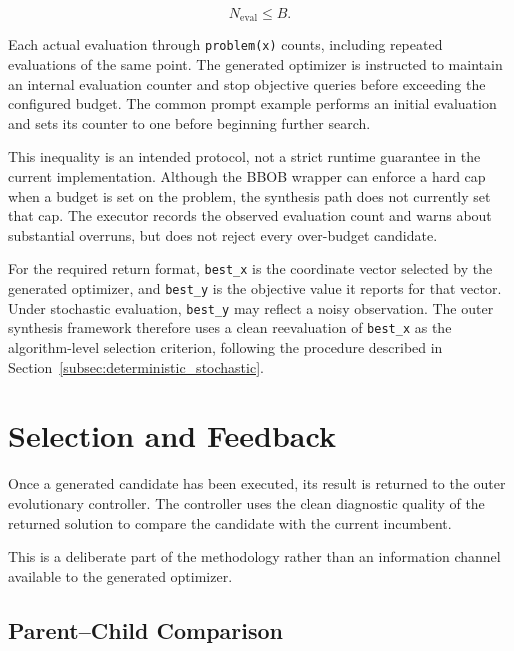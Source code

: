 \begin{equation}
N_{\mathrm{eval}} \leq B.
\label{eq:evaluation_budget}
\end{equation}

Each actual evaluation through \texttt{problem(x)} counts, including repeated evaluations of the same point. The generated optimizer is instructed to maintain an internal evaluation counter and stop objective queries before exceeding the configured budget. The common prompt example performs an initial evaluation and sets its counter to one before beginning further search.

This inequality is an intended protocol, not a strict runtime guarantee in the current implementation. Although the BBOB wrapper can enforce a hard cap when a budget is set on the problem, the synthesis path does not currently set that cap. The executor records the observed evaluation count and warns about substantial overruns, but does not reject every over-budget candidate.

For the required return format, \texttt{best\_x} is the coordinate vector selected by the generated optimizer, and \texttt{best\_y} is the objective value it reports for that vector. Under stochastic evaluation, \texttt{best\_y} may reflect a noisy observation. The outer synthesis framework therefore uses a clean reevaluation of \texttt{best\_x} as the algorithm-level selection criterion, following the procedure described in Section~\ref{subsec:deterministic_stochastic}.


\section{Selection and Feedback}
\label{sec:candidate_selection}

Once a generated candidate has been executed, its result is returned to the
outer evolutionary controller. The controller uses the clean diagnostic
quality of the returned solution to compare the candidate with the current
incumbent.

This is a deliberate part of the methodology rather than an information
channel available to the generated optimizer.

\subsection{Parent--Child Comparison}
\label{subsec:parent_child_comparison}

